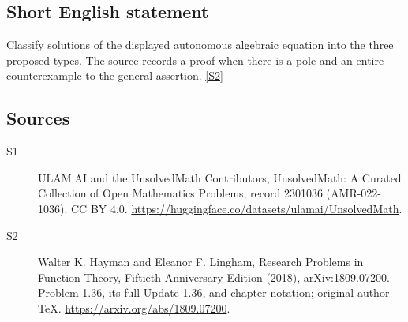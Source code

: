 \documentclass[11pt]{article}
\newcommand{\sref}[2]{\hyperlink{source:#1:#2}{[S#2]}}
\begin{document}
\subsection{Short English statement}
Classify solutions of the displayed autonomous algebraic equation into the three proposed types. The source records a proof when there is a pole and an entire counterexample to the general assertion. \sref{2301036}{2}
\subsection{Sources}
\begin{description}
\item[\hypertarget{source:2301036:1}{S1}] ULAM.AI and the UnsolvedMath Contributors, UnsolvedMath: A Curated Collection of Open Mathematics Problems, record 2301036 (AMR-022-1036). CC BY 4.0. \url{https://huggingface.co/datasets/ulamai/UnsolvedMath}.
\item[\hypertarget{source:2301036:2}{S2}] Walter K. Hayman and Eleanor F. Lingham, Research Problems in Function Theory, Fiftieth Anniversary Edition (2018), arXiv:1809.07200. Problem 1.36, its full Update 1.36, and chapter notation; original author TeX. \url{https://arxiv.org/abs/1809.07200}.
\end{description}
\label{end:2301036}
\end{document}
